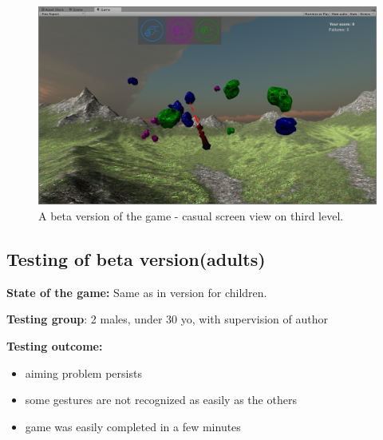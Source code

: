 \begin{figure}
\includegraphics[width=\textwidth]{graphics/screen_v2b.png} 
\caption{A beta version of the game - casual screen view on third level.}
\end{figure}

\subsection{Testing of beta version(adults)}


\textbf{State of the game:} Same as in version for children.


\textbf{Testing group}: 2 males, under 30 yo, with supervision of author

\textbf{Testing outcome:}

\begin{itemize}
\item aiming problem persists
\item some gestures are not recognized as easily as the others
\item game was easily completed in a few minutes
\end{itemize}

